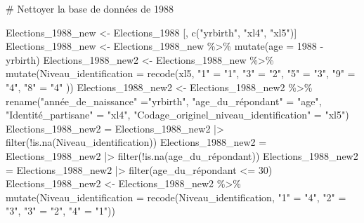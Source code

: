 \documentclass[
  letterpaper,
  DIV=11,
  numbers=noendperiod]{scrartcl}
\newenvironment{Shaded}{\begin{snugshade}}{\end{snugshade}}
\newcommand{\AttributeTok}[1]{\textcolor[rgb]{0.40,0.45,0.13}{#1}}
\newcommand{\CommentTok}[1]{\textcolor[rgb]{0.37,0.37,0.37}{#1}}
\newcommand{\DecValTok}[1]{\textcolor[rgb]{0.68,0.00,0.00}{#1}}
\newcommand{\FunctionTok}[1]{\textcolor[rgb]{0.28,0.35,0.67}{#1}}
\newcommand{\NormalTok}[1]{\textcolor[rgb]{0.00,0.23,0.31}{#1}}
\newcommand{\OtherTok}[1]{\textcolor[rgb]{0.00,0.23,0.31}{#1}}
\newcommand{\SpecialCharTok}[1]{\textcolor[rgb]{0.37,0.37,0.37}{#1}}
\newcommand{\StringTok}[1]{\textcolor[rgb]{0.13,0.47,0.30}{#1}}
\begin{document}
\begin{Shaded}
\begin{Highlighting}[]
\CommentTok{\# Nettoyer la base de données de 1988}

\NormalTok{Elections\_1988\_new }\OtherTok{\textless{}{-}}\NormalTok{ Elections\_1988 [, }\FunctionTok{c}\NormalTok{(}\StringTok{"yrbirth"}\NormalTok{, }\StringTok{"xl4"}\NormalTok{, }\StringTok{"xl5"}\NormalTok{)]}
\NormalTok{Elections\_1988\_new }\OtherTok{\textless{}{-}}\NormalTok{ Elections\_1988\_new }\SpecialCharTok{\%\textgreater{}\%} \FunctionTok{mutate}\NormalTok{(}\AttributeTok{age =} \DecValTok{1988} \SpecialCharTok{{-}}\NormalTok{ yrbirth)}
\NormalTok{Elections\_1988\_new2 }\OtherTok{\textless{}{-}}\NormalTok{ Elections\_1988\_new }\SpecialCharTok{\%\textgreater{}\%} \FunctionTok{mutate}\NormalTok{(}\AttributeTok{Niveau\_identification =} \FunctionTok{recode}\NormalTok{(xl5, }\StringTok{"1"} \OtherTok{=} \StringTok{"1"}\NormalTok{, }\StringTok{"3"} \OtherTok{=} \StringTok{"2"}\NormalTok{, }\StringTok{"5"} \OtherTok{=} \StringTok{"3"}\NormalTok{, }\StringTok{"9"} \OtherTok{=} \StringTok{"4"}\NormalTok{, }\StringTok{"8"} \OtherTok{=} \StringTok{"4"}\NormalTok{ ))}
\NormalTok{Elections\_1988\_new2 }\OtherTok{\textless{}{-}}\NormalTok{ Elections\_1988\_new2 }\SpecialCharTok{\%\textgreater{}\%} \FunctionTok{rename}\NormalTok{(}\StringTok{"année\_de\_naissance"} \OtherTok{=}\StringTok{"yrbirth"}\NormalTok{, }\StringTok{"age\_du\_répondant"} \OtherTok{=} \StringTok{"age"}\NormalTok{, }\StringTok{"Identité\_partisane"} \OtherTok{=} \StringTok{"xl4"}\NormalTok{, }\StringTok{"Codage\_originel\_niveau\_identification"} \OtherTok{=} \StringTok{"xl5"}\NormalTok{)}
\NormalTok{Elections\_1988\_new2 }\OtherTok{=}\NormalTok{ Elections\_1988\_new2 }\SpecialCharTok{|\textgreater{}} \FunctionTok{filter}\NormalTok{(}\SpecialCharTok{!}\FunctionTok{is.na}\NormalTok{(Niveau\_identification))}
\NormalTok{Elections\_1988\_new2 }\OtherTok{=}\NormalTok{ Elections\_1988\_new2 }\SpecialCharTok{|\textgreater{}} \FunctionTok{filter}\NormalTok{(}\SpecialCharTok{!}\FunctionTok{is.na}\NormalTok{(age\_du\_répondant))}
\NormalTok{Elections\_1988\_new2 }\OtherTok{=}\NormalTok{ Elections\_1988\_new2 }\SpecialCharTok{|\textgreater{}} \FunctionTok{filter}\NormalTok{(age\_du\_répondant }\SpecialCharTok{\textless{}=} \DecValTok{30}\NormalTok{)}
\NormalTok{Elections\_1988\_new2 }\OtherTok{\textless{}{-}}\NormalTok{ Elections\_1988\_new2 }\SpecialCharTok{\%\textgreater{}\%} \FunctionTok{mutate}\NormalTok{(}\AttributeTok{Niveau\_identification =} \FunctionTok{recode}\NormalTok{(Niveau\_identification, }\StringTok{"1"} \OtherTok{=} \StringTok{"4"}\NormalTok{, }\StringTok{"2"} \OtherTok{=} \StringTok{"3"}\NormalTok{, }\StringTok{"3"} \OtherTok{=} \StringTok{"2"}\NormalTok{, }\StringTok{"4"} \OtherTok{=} \StringTok{"1"}\NormalTok{))}

\end{Highlighting}
\end{Shaded}
\end{document}
